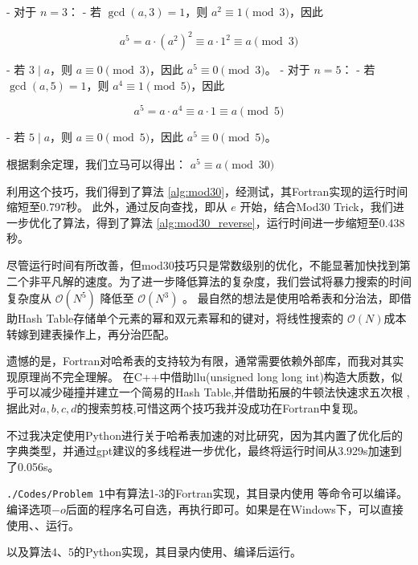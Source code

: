 - 对于 \(n = 3\)：
- 若 \(\gcd(a, 3) = 1\)，则 \(a^2 \equiv 1 \pmod{3}\)，因此

\[
    a^5 = a \cdot (a^2)^2 \equiv a \cdot 1^2 \equiv a \pmod{3}
\]

- 若 \(3 \mid a\)，则 \(a \equiv 0 \pmod{3}\)，因此 \(a^5 \equiv 0 \pmod{3}\)。
- 对于 \(n = 5\)：
- 若 \(\gcd(a, 5) = 1\)，则 \(a^4 \equiv 1 \pmod{5}\)，因此

\[
    a^5 = a \cdot a^4 \equiv a \cdot 1 \equiv a \pmod{5}
\]

- 若 \(5 \mid a\)，则 \(a \equiv 0 \pmod{5}\)，因此 \(a^5 \equiv 0 \pmod{5}\)。

根据剩余定理，我们立马可以得出：
$a^5 \equiv a \pmod{30}$

利用这个技巧，我们得到了算法 \ref{alg:mod30}，经测试，其Fortran实现的运行时间缩短至0.797秒。
此外，通过反向查找，即从 \(e\) 开始，结合Mod30 Trick，我们进一步优化了算法，得到了算法 \ref{alg:mod30_reverse}，运行时间进一步缩短至0.438秒。

尽管运行时间有所改善，但mod30技巧只是常数级别的优化，不能显著加快找到第二个非平凡解的速度。为了进一步降低算法的复杂度，我们尝试将暴力搜索的时间复杂度从 \(\mathcal{O}(N^5)\) 降低至 \(\mathcal{O}(N^3)\) 。
最自然的想法是使用哈希表和分治法，即借助Hash Table存储单个元素的幂和双元素幂和的键对，将线性搜索的 \(\mathcal{O}(N)\)成本转嫁到建表操作上，再分治匹配。

遗憾的是，Fortran对哈希表的支持较为有限，通常需要依赖外部库，而我对其实现原理尚不完全理解。
在C++中借助llu(unsigned long long int)构造大质数，似乎可以减少碰撞并建立一个简易的Hash Table,并借助拓展的牛顿法快速求五次根
,据此对$a,b,c,d$的搜索剪枝,可惜这两个技巧我并没成功在Fortran中复现。

不过我决定使用Python进行关于哈希表加速的对比研究，因为其内置了优化后的字典类型，并通过gpt建议的多线程进一步优化，最终将运行时间从3.929s加速到了0.056s。

\texttt{./Codes/Problem 1}中有算法1-3的Fortran实现，其目录内使用
等命令可以编译。
编译选项$-o$后面的程序名可自选，再执行即可。如果是在Windows下，可以直接使用、、运行。

以及算法4、5的Python实现，其目录内使用、编译后运行。
\newpage
